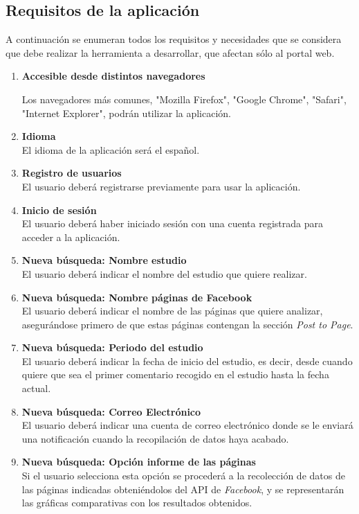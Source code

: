 \subsection{Requisitos de la aplicación}
A continuación se enumeran todos los requisitos y necesidades que se considera que debe realizar la herramienta a desarrollar, que afectan sólo al portal web. 
\begin{enumerate} \itemsep4pt \parskip0pt
\item \textbf{Accesible desde distintos navegadores}

Los navegadores más comunes, "Mozilla Firefox", "Google Chrome", "Safari", "Internet Explorer", podrán utilizar la aplicación.
\item \textbf{Idioma} \\
El idioma de la aplicación será el español.
\item \textbf{Registro de usuarios} \\
El usuario deberá registrarse previamente para usar la  aplicación.
\item \textbf{Inicio de sesión} \\ 
El usuario deberá haber iniciado sesión con una cuenta registrada para acceder a la aplicación.
\item \textbf{Nueva búsqueda: Nombre estudio} \\
El usuario deberá indicar el nombre del estudio que quiere realizar.
\item \textbf{Nueva búsqueda: Nombre páginas de Facebook} \\
El usuario deberá indicar el nombre de las páginas que quiere analizar, asegurándose primero de que estas páginas contengan la sección \textit{Post to Page}.
\item \textbf{Nueva búsqueda: Periodo del estudio} \\
El usuario deberá indicar la fecha de inicio del estudio, es decir, desde cuando quiere que sea el primer comentario recogido en el estudio hasta la fecha actual. 
\item \textbf{Nueva búsqueda: Correo Electrónico} \\
El usuario deberá indicar una cuenta de correo electrónico donde se le enviará una notificación cuando la recopilación de datos haya acabado. 
\item \textbf{Nueva búsqueda: Opción informe de las páginas}\\
Si el usuario selecciona esta opción se procederá a la recolección de datos de las páginas indicadas obteniéndolos del API de \textit{Facebook}, y se representarán las gráficas comparativas con los resultados obtenidos.

\end{enumerate}
